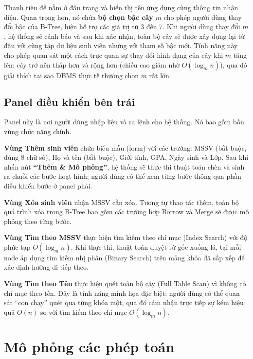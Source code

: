 \documentclass[12pt,a4paper]{article}
\begin{document}
Thanh tiêu đề nằm ở đầu trang và hiển thị tên ứng dụng cùng thông tin nhận diện. Quan trọng hơn, nó chứa \textbf{bộ chọn bậc cây $m$} cho phép người dùng thay đổi bậc của B-Tree, hiện hỗ trợ các giá trị từ 3 đến 7. Khi người dùng thay đổi $m$, hệ thống sẽ cảnh báo và sau khi xác nhận, toàn bộ cây sẽ được xây dựng lại từ đầu với cùng tập dữ liệu sinh viên nhưng với tham số bậc mới. Tính năng này cho phép quan sát một cách trực quan sự thay đổi hình dạng của cây khi $m$ tăng lên: cây trở nên thấp hơn và rộng hơn (chiều cao giảm nhờ $O(\log_m n)$), qua đó giải thích tại sao DBMS thực tế thường chọn $m$ rất lớn.

\subsection{Panel điều khiển bên trái}

Panel này là nơi người dùng nhập liệu và ra lệnh cho hệ thống. Nó bao gồm bốn vùng chức năng chính.

\textbf{Vùng Thêm sinh viên} chứa biểu mẫu (form) với các trường: MSSV (bắt buộc, đúng 8 chữ số), Họ và tên (bắt buộc), Giới tính, GPA, Ngày sinh và Lớp. Sau khi nhấn nút \textbf{``Thêm \& Mô phỏng''}, hệ thống sẽ thực thi thuật toán chèn và sinh ra chuỗi các bước hoạt hình; người dùng có thể xem từng bước thông qua phần điều khiển bước ở panel phải.

\textbf{Vùng Xóa sinh viên} nhận MSSV cần xóa. Tương tự thao tác thêm, toàn bộ quá trình xóa trong B-Tree bao gồm các trường hợp Borrow và Merge sẽ được mô phỏng theo từng bước.

\textbf{Vùng Tìm theo MSSV} thực hiện tìm kiếm theo chỉ mục (Index Search) với độ phức tạp $O(\log_m n)$. Khi thực thi, thuật toán duyệt từ gốc xuống lá, tại mỗi node áp dụng tìm kiếm nhị phân (Binary Search) trên mảng khóa đã sắp xếp để xác định hướng đi tiếp theo.

\textbf{Vùng Tìm theo Tên} thực hiện quét toàn bộ cây (Full Table Scan) vì không có chỉ mục theo tên. Đây là tính năng minh họa đặc biệt: người dùng có thể quan sát ``con chạy'' quét qua từng khóa một, qua đó cảm nhận trực tiếp sự kém hiệu quả $O(n)$ so với tìm kiếm theo chỉ mục $O(\log_m n)$.

\section{Mô phỏng các phép toán}
\end{document}
